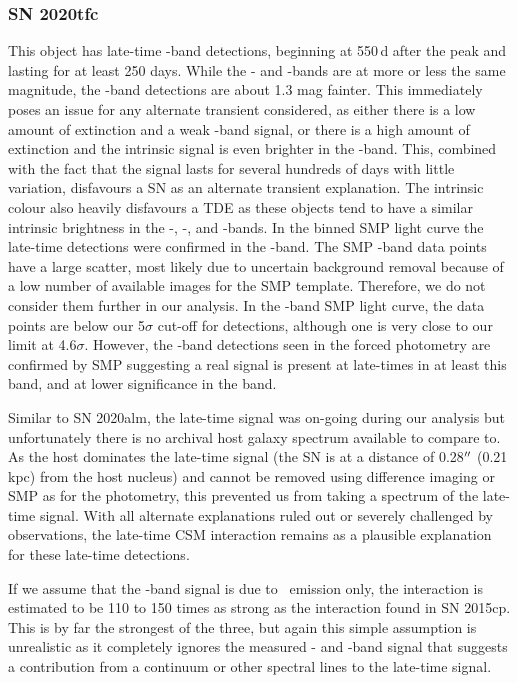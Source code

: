 \documentclass[a4paper,oneside,12pt, class=Latex/Classes/PhDthesisPSnPDF, crop=false]{standalone}
\begin{document}
\subsubsection*{SN 2020tfc}
This object has late-time \ztfg\ztfr\ztfi-band detections, beginning at 550\,d after the peak and lasting for at least 250 days. While the \ztfr- and \ztfi-bands are at more or less the same magnitude, the \ztfg-band detections are about 1.3 mag fainter. This immediately poses an issue for any alternate transient considered, as either there is a low amount of extinction and a weak \ztfg-band signal, or there is a high amount of extinction and the intrinsic signal is even brighter in the \ztfi-band. This, combined with the fact that the signal lasts for several hundreds of days with little variation, disfavours a SN as an alternate transient explanation. The intrinsic colour also heavily disfavours a TDE as these objects tend to have a similar intrinsic brightness in the \ztfg-, \ztfr-, and \ztfi-bands. In the binned SMP light curve the late-time detections were confirmed in the \ztfg-band. The SMP \ztfi-band data points have a large scatter, most likely due to uncertain background removal because of a low number of available images for the SMP template. Therefore, we do not consider them further in our analysis. In the \ztfr-band SMP light curve, the data points are below our 5$\sigma$ cut-off for detections, although one is very close to our limit at 4.6$\sigma$. However, the \ztfg-band detections seen in the forced photometry are confirmed by SMP suggesting a real signal is present at late-times in at least this band, and at lower significance in the \ztfr band. 

Similar to SN 2020alm, the late-time signal was on-going during our analysis but unfortunately there is no archival host galaxy spectrum available to compare to. As the host dominates the late-time signal (the SN is at a distance of 0.28$^{\prime\prime}$ (0.21 kpc) from the host nucleus) and cannot be removed using difference imaging or SMP as for the photometry, this prevented us from taking a spectrum of the late-time signal. With all alternate explanations ruled out or severely challenged by observations, the late-time CSM interaction remains as a plausible explanation for these late-time detections. 

If we assume that the \ztfr-band signal is due to \Halpha~emission only, the interaction is estimated to be 110 to 150 times as strong as the interaction found in SN 2015cp. This is by far the strongest of the three, but again this simple assumption is unrealistic as it completely ignores the measured \ztfg- and \ztfi-band signal that suggests a contribution from a continuum or other spectral lines to the late-time signal. 
 
\end{document}
